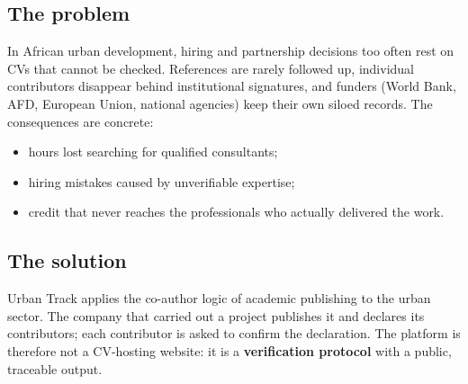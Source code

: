 \documentclass[11pt,a4paper]{article}
\begin{document}
\subsection{The problem}

In African urban development, hiring and partnership decisions too often rest
on CVs that cannot be checked. References are rarely followed up, individual
contributors disappear behind institutional signatures, and funders
(World Bank, AFD, European Union, national agencies) keep their own siloed
records. The consequences are concrete:

\begin{itemize}[leftmargin=1.4em,itemsep=3pt]
  \item hours lost searching for qualified consultants;
  \item hiring mistakes caused by unverifiable expertise;
  \item credit that never reaches the professionals who actually delivered the work.
\end{itemize}

\subsection{The solution}

Urban Track applies the co-author logic of academic publishing to the urban
sector. The company that carried out a project publishes it and declares its
contributors; each contributor is asked to confirm the declaration. The
platform is therefore not a CV-hosting website: it is a \textbf{verification
protocol} with a public, traceable output.

\begin{center}
\end{center}
\end{document}
